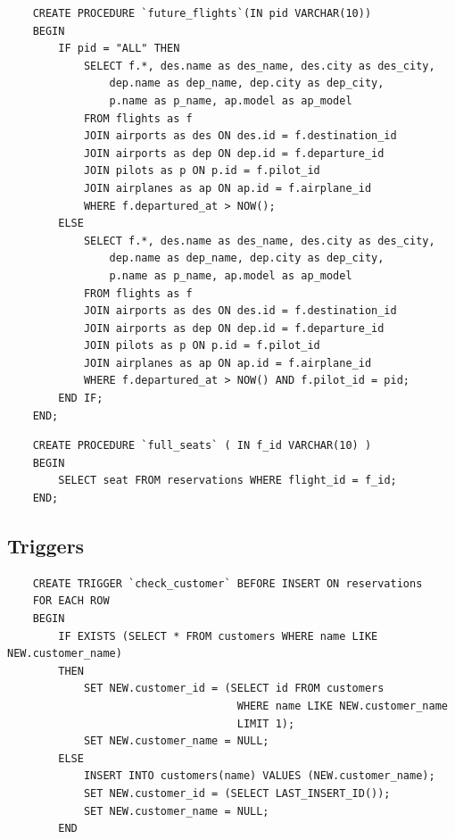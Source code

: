 \documentclass[12pt,a4paper]{article}
\begin{document}
\begin{code}
\begin{verbatim}
    CREATE PROCEDURE `future_flights`(IN pid VARCHAR(10))
    BEGIN
        IF pid = "ALL" THEN
            SELECT f.*, des.name as des_name, des.city as des_city,
                dep.name as dep_name, dep.city as dep_city,
                p.name as p_name, ap.model as ap_model
            FROM flights as f
            JOIN airports as des ON des.id = f.destination_id
            JOIN airports as dep ON dep.id = f.departure_id
            JOIN pilots as p ON p.id = f.pilot_id
            JOIN airplanes as ap ON ap.id = f.airplane_id
            WHERE f.departured_at > NOW();
        ELSE
            SELECT f.*, des.name as des_name, des.city as des_city,
                dep.name as dep_name, dep.city as dep_city,
                p.name as p_name, ap.model as ap_model
            FROM flights as f
            JOIN airports as des ON des.id = f.destination_id
            JOIN airports as dep ON dep.id = f.departure_id
            JOIN pilots as p ON p.id = f.pilot_id
            JOIN airplanes as ap ON ap.id = f.airplane_id
            WHERE f.departured_at > NOW() AND f.pilot_id = pid;
        END IF;
    END;
\end{verbatim}
\end{code}

\begin{code}
\begin{verbatim}
    CREATE PROCEDURE `full_seats` ( IN f_id VARCHAR(10) )
    BEGIN
        SELECT seat FROM reservations WHERE flight_id = f_id;
    END;
\end{verbatim}
\end{code}


\subsection{Triggers}
\begin{code}
\begin{verbatim}
    CREATE TRIGGER `check_customer` BEFORE INSERT ON reservations
    FOR EACH ROW
    BEGIN
        IF EXISTS (SELECT * FROM customers WHERE name LIKE NEW.customer_name)
        THEN
            SET NEW.customer_id = (SELECT id FROM customers
                                    WHERE name LIKE NEW.customer_name
                                    LIMIT 1);
            SET NEW.customer_name = NULL;
        ELSE
            INSERT INTO customers(name) VALUES (NEW.customer_name);
            SET NEW.customer_id = (SELECT LAST_INSERT_ID());
            SET NEW.customer_name = NULL;
        END
\end{verbatim}
\end{code}
\end{document}
